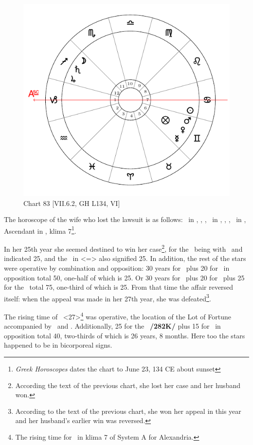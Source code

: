 \newpage
\begin{figure}
\centering
\vspace{0pt}
\includegraphics[width=.68\textwidth]{charts/7_6_02}
\caption{Chart 83 [VII.6.2, GH L134, VI]}
\label{fig:chart83}
\end{figure} 

The horoscope of the wife who lost the lawsuit is as follows: \Sun\, in \Cancer, \Moon, \Saturn, \Jupiter\, in
\Sagittarius, \Mars, \Venus, \Mercury\, in \Gemini, Ascendant in \Capricorn, klima 7\footnote{\textit{Greek Horoscopes} dates the chart to June 23, 134 CE about sunset}.

In her 25th year she seemed destined to win her case\footnote{According the text of the previous chart, she lost her case and her husband won.}, for the \Moon\, being with \Jupiter\, and \Saturn\, indicated 25, and the \Sun\, in \Cancer <=\Moon> also signified 25. In addition, the rest of the stars were operative by combination and opposition: 30 years for \Saturn\, plus 20 for \Mercury\, in opposition total 50, one-half of which is 25. Or 30
years for \Saturn\, plus 20 for \Mercury\, plus 25 for the \Moon\, total 75, one-third of which is 25. From that time the affair reversed itself: when the appeal was made in her 27th year, she was defeated\footnote{According to the text of the previous chart, she won her appeal in this year and her husband's earlier win was reversed.}. 

The rising time of \Gemini\, <27>\footnote{The rising time for \Gemini\, in klima 7 of System A for Alexandria.} was operative, the location of the Lot of Fortune accompanied by \Mars\, and \Mercury. Additionally, 25 for the \Moon\, \textbf{/282K/} plus 15 for \Mars\, in opposition total 40, two-thirds of which is 26 years, 8 months. Here too the stars happened to be in bicorporeal signs.

